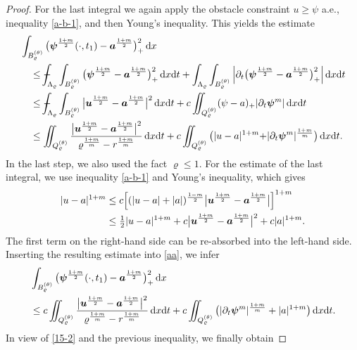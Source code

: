 \documentclass[a4paper, 10pt, american]{amsart}
\numberwithin{theorem}{section}
\numberwithin{equation}{section}
\newcommand{\mint}{- \mskip-19,5mu \int}
\newcommand{\dxdt}{\,\mathrm{d}x\mathrm{d}t}
\newcommand{\dx}{\,\mathrm{d}x}
\renewcommand{\rho}{\varrho}
\newcommand{\power}[2]{\bm{#1^{\mbox{\unboldmath{\scriptsize$#2$}}}}}
\begin{document}
\begin{proof}
For the last integral we again apply the obstacle constraint
$u\ge\psi$ a.e., inequality \eqref{a-b-1}, and then Young's inequality.
This yields the estimate
\begin{align}\label{aa}\nonumber
	&\int_{B_\rho^{(\theta)}}  \big( \power{\psi}{\frac{1+m}2}(\cdot,t_1) - \power a {\frac{1+m}2} \big)_+^2 \dx \\\nonumber
	& \quad \le 
	\mint_{\Lambda_\rho} \int_{B_\rho^{(\theta)} }  \big( \power \psi {\frac{1+m}2} - \power a {\frac{1+m}2} \big)_+^2 \dxdt
	+
	\int_{\Lambda_\rho}\int_{B_\rho^{(\theta)}} \Big| \partial_{t} \big( \power \psi {\frac{1+m}2} - \power a {\frac{1+m}2} \big)_+^2 \Big|  \dxdt  \\\nonumber
	 & \quad \le
	 \mint_{\Lambda_\rho} \int_{B_\rho^{(\theta)} }  \big| \power u {\frac{1+m}2} - \power a {\frac{1+m}2} \big|^2 \dxdt
	 +
	 c\iint_{Q_\rho^{(\theta)}} (  \psi - a )_+  |\partial_{t} \power \psi m| \dxdt \\
	 & \quad \le
	 \iint_{Q_\rho^{(\theta)} }  \frac{\big| \power u {\frac{1+m}2} - \power a {\frac{1+m}2} \big|^2}{\rho^{\frac{1+m}m} - r^{\frac{1+m}m}} \dxdt
	 +
	 c\iint_{Q_\rho^{(\theta)}}\big( | u-a|^{1+m} {+} |\partial_{t} \power \psi m|^{\frac{1+m}m} \big)\dxdt  . 
\end{align}
In the last step, we also used the fact $\rho\le1$.
For the estimate
of the last integral, we use inequality \eqref{a-b-1} and Young's inequality, which gives
\begin{align}\label{elementary}\nonumber
  |u-a|^{1+m}
  &\le
  c\Big[(|u-a|+|a|)^{\frac{1-m}2}\big|\power{u}{\frac{1+m}2}-\power{a}{\frac{1+m}2}\big|\Big]^{1+m}\\
  &\le\tfrac12|u-a|^{1+m}
  +
  c\big|\power{u}{\frac{1+m}2}-\power{a}{\frac{1+m}2}\big|^2+c|a|^{1+m}.
\end{align}
The first term on the right-hand side can be re-absorbed into the
left-hand side. Inserting the resulting estimate into \eqref{aa}, we infer
\begin{align*}
\nonumber
	&\int_{B_\rho^{(\theta)}}  \big( \power{\psi}{\frac{1+m}2}(\cdot,t_1) - \power a {\frac{1+m}2} \big)_+^2 \dx \\
	&\le 
	c\iint_{Q_\rho^{(\theta)}} 
	\frac{ \big|\power u {\frac{1+m}2} - \power a {\frac{1+m}2}\big|^2}{\rho^{\frac{1+m}{m}}-r^{\frac{1+m}{m}}} \dxdt 
        +
        c\iint_{Q_\rho^{(\theta)}}  \big( |\partial_{t} \power \psi m |^{\frac{1+m}m} +|a|^{1+m}\big)\dxdt.
\end{align*}
In view of \eqref{15-2} and the previous inequality, we finally obtain

\end{proof}
\end{document}
